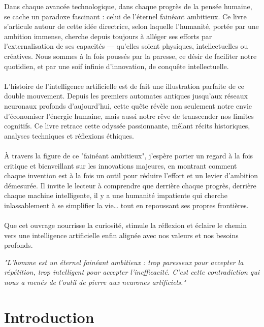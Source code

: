 \documentclass[12pt,a4paper]{book}
\begin{document}
Dans chaque avancée technologique, dans chaque progrès de la pensée humaine, se cache un paradoxe fascinant : celui de l'éternel fainéant ambitieux. Ce livre s'articule autour de cette idée directrice, selon laquelle l'humanité, portée par une ambition immense, cherche depuis toujours à alléger ses efforts par l'externalisation de ses capacités — qu'elles soient physiques, intellectuelles ou créatives. Nous sommes à la fois poussés par la paresse, ce désir de faciliter notre quotidien, et par une soif infinie d'innovation, de conquête intellectuelle.
\\ \\
L'histoire de l'intelligence artificielle est de fait une illustration parfaite de ce double mouvement. Depuis les premiers automates antiques jusqu'aux réseaux neuronaux profonds d'aujourd'hui, cette quête révèle non seulement notre envie d'économiser l'énergie humaine, mais aussi notre rêve de transcender nos limites cognitifs. Ce livre retrace cette odyssée passionnante, mêlant récits historiques, analyses techniques et réflexions éthiques.
\\ \\
À travers la figure de ce "fainéant ambitieux", j'espère porter un regard à la fois critique et bienveillant sur les innovations majeures, en montrant comment chaque invention est à la fois un outil pour réduire l'effort et un levier d'ambition démesurée. Il invite le lecteur à comprendre que derrière chaque progrès, derrière chaque machine intelligente, il y a une humanité impatiente qui cherche inlassablement à se simplifier la vie… tout en repoussant ses propres frontières.
\\ \\
Que cet ouvrage nourrisse la curiosité, stimule la réflexion et éclaire le chemin vers une intelligence artificielle enfin alignée avec nos valeurs et nos besoins profonds.
\\
\begin{citationmd}
\centering\itshape\large
"L'homme est un éternel fainéant ambitieux : trop paresseux pour accepter la répétition, trop intelligent pour accepter l'inefficacité. C'est cette contradiction qui nous a menés de l'outil de pierre aux neurones artificiels."
\end{citationmd}

\newpage 

\tableofcontents

\newpage

\section{Introduction}
\end{document}
